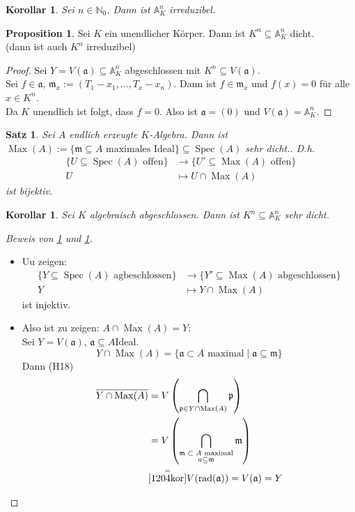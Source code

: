 \documentclass[10pt,a4paper]{article}
\newcommand{\N}{\ensuremath{\mathbb{N}}}
\newcommand{\AF}{\ensuremath{\mathbb{A}}}
\newcommand{\ol}[1]{\overline{#1}}
\newcommand{\Spec}{\ensuremath{\operatorname{Spec}}}
\newcommand{\rad}{\ensuremath{\operatorname{rad}}}
\newcommand{\Max}{\ensuremath{\operatorname{Max}}}
\newcounter{thm}[section]
\theoremstyle{definition}
\newtheorem{prop}[thm]{Proposition}
\theoremstyle{plain}
\newtheorem{kor}[thm]{Korollar}
\newtheorem{satz}[thm]{Satz}
\theoremstyle{remark}
\begin{document}
\begin{kor}
	Sei $n\in\N_0$. Dann ist $\AF_K^n$ irreduzibel.
\end{kor}

\begin{prop}
	Sei $K$ ein unendlicher Körper. Dann ist $K^n\subseteq\AF_K^n$ dicht.\\
	(dann ist auch $K^n$ irreduzibel)
\end{prop}
\begin{proof}
	Sei $Y=V(\mathfrak a)\subseteq \AF_K^n$ abgeschlossen mit $K^n\subseteq V(\mathfrak a)$.\\
	Sei $f\in\mathfrak a$, $\mathfrak m_x:=(T_1-x_1,...,T_x-x_n)$. Dann ist $f\in\mathfrak m_x$ und $f(x)=0$ für alle $x\in K^n$.\\
	Da $K$ unendlich ist folgt, dass $f=0$. Also ist $\mathfrak a=(0)$ und $V(\mathfrak a)=\AF_K^n$.
\end{proof}

\begin{satz}\label{1213satz}
	Sei $A$ endlich erzeugte $K$-Algebra. Dann ist $\Max(A):=\{\mathfrak m\subseteq A\text{ maximales Ideal}\}\subseteq\Spec(A)$ sehr dicht.. D.h.
	\begin{align*}
	\{\text{$U\subseteq\Spec(A)$ offen}\}&\to\{\text{$U'\subseteq \Max(A)$ offen}\}\\
	U&\mapsto U\cap\Max(A)
	\end{align*}
	ist bijektiv.
\end{satz}
\begin{kor}\label{1214kor}
	Sei $K$ algebraisch abgeschlossen. Dann ist $K^n\subseteq \AF_K^n$ sehr dicht.
\end{kor}
\begin{proof}[Beweis von \ref{1213satz} und \ref{1214kor}]
\begin{itemize}
	\item Uu zeigen:
		\begin{align*}
		\{\text{$Y\subseteq \Spec(A)$ agbeschlossen}\}&\to\{\text{$Y'\subseteq\Max(A)$ abgeschlossen}\}\\
		Y&\mapsto Y\cap\Max(A)
		\end{align*}
		ist injektiv.\\
		\item Also ist zu zeigen: $\ol{A\cap\Max(A)}=Y$:\\
		Sei $Y=V(\mathfrak a)$, $\mathfrak a\subseteq A$Ideal.
		\[Y\cap\Max(A)=\{\text{$\mathfrak a\subset A$ maximal} \mid\mathfrak a\subseteq\mathfrak m\}\]
		Dann (H18)
		\begin{align*}
		\ol{Y\cap\Max(A)}
		&=V\left(\bigcap_{\mathfrak p\in Y\cap \Max(A)}\mathfrak p\right)\\
		&=V\left(\bigcap_{\substack{\text{$\mathfrak m\subset A$ maximal}\\ a\subseteq\mathfrak m}}\mathfrak m\right)\\
		&\overset{=}{\ref{1204kor}} V(\rad(\mathfrak a))=V(\mathfrak a)=Y
		\end{align*}
\end{itemize}
\end{proof}
\end{document}
